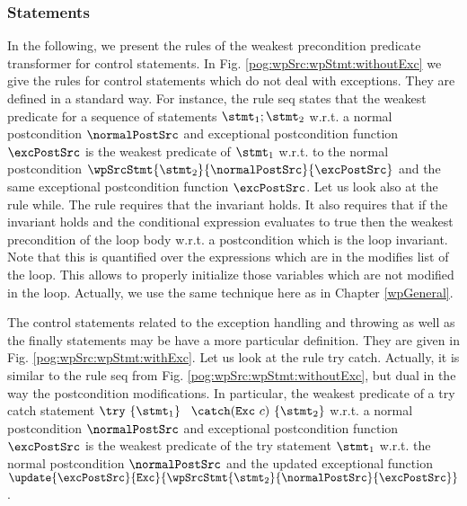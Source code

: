 
\subsubsection{Statements}\label{pog:wpSrc:wpStmt}
In the following, we present the rules of the weakest precondition predicate transformer for 
control statements. In Fig. \ref{pog:wpSrc:wpStmt:withoutExc} we give the rules for control 
statements which do not deal with exceptions. They are defined in a standard way. 
For instance, the rule \textsf{seq} states that the weakest predicate for a sequence of statements  $\stmt_1;\stmt_2$
w.r.t. a normal postcondition $\normalPostSrc$ and exceptional postcondition function $ \excPostSrc$
is the weakest  predicate of $\stmt_1$ w.r.t. to the normal postcondition $ \wpSrcStmt{\stmt_2 }{\normalPostSrc }{ \excPostSrc} $
and the same exceptional postcondition function $ \excPostSrc$.
Let us look also at the rule \textsf{while}. The rule requires that the invariant 
holds. It also requires that if the invariant holds and the conditional expression evaluates to true then the
weakest precondition of the loop body w.r.t. a postcondition which is the loop invariant. Note that this is quantified over
the expressions which are in the modifies list \modLoop{} of the loop. This allows to properly initialize those variables which are not
modified in the loop. Actually, we use the same technique here as in Chapter \ref{wpGeneral}.

The control statements related to the exception handling and throwing as well as the finally statements
may be have a more particular definition. They are given in Fig. \ref{pog:wpSrc:wpStmt:withExc}. 
Let us look at the rule \textsf{try catch}. Actually, it is similar to the  rule  \textsf{seq} from 
Fig. \ref{pog:wpSrc:wpStmt:withoutExc}, but dual in the way the postcondition modifications. In particular, 
the weakest predicate of a try catch statement $ \try \ \{ \stmt_1 \} \ $ 
$\catch (  \mbox{\rm\texttt{Exc}} \ c )\ \{ \stmt_2 \} $  w.r.t. a normal postcondition   $\normalPostSrc$  and exceptional postcondition function $ \excPostSrc$
is the weakest predicate of the try statement $\stmt_1$ w.r.t. the normal postcondition  $\normalPostSrc$  and the updated exceptional function
$\update{\excPostSrc}{ \mbox{\rm\texttt{Exc}} }{\wpSrcStmt{\stmt_2}{ \normalPostSrc}{\excPostSrc} }$.

